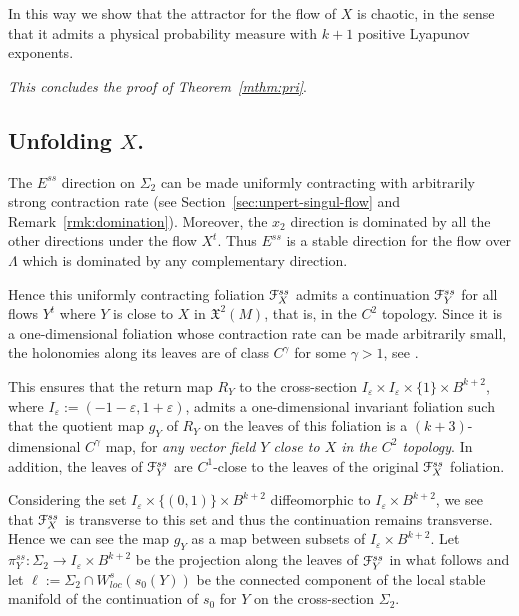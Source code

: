 \documentclass[reqno,12pt,a4paper]{amsart}
\theoremstyle{plain}
\theoremstyle{definition}
\begin{document}
In this way we show that the attractor for the flow of
$X$ is chaotic, in the sense that it admits a physical
probability measure with $k+1$ positive Lyapunov exponents.

\emph{This concludes the proof of Theorem~\ref{mthm:pri}}.

\subsection{Unfolding $X$.}
\label{sec:unfold-x}

The $E^{ss}$ direction on $\Sigma_2$ can be made uniformly
contracting with arbitrarily strong contraction rate (see
Section~\ref{sec:unpert-singul-flow} and
Remark~\ref{rmk:domination}). Moreover, the $x_2$
direction is dominated by all the other
directions under the flow $X^t$. Thus $E^{ss}$ 
is a stable direction for the flow over $\Lambda$ which is
dominated by any complementary direction.

Hence this uniformly contracting foliation ${\EuScript{F}}^{ss}_X$ admits
a continuation ${\EuScript{F}}^{ss}_Y$ for all flows $Y^t$ where $Y$ is
close to $X$ in ${{\mathfrak X}}^2(M)$, that is, in the $C^2$
topology. Since it is a one-dimensional foliation whose
contraction rate can be made arbitrarily small, the
holonomies along its leaves are of class $C^{\gamma}$ for
some $\gamma>1$, see \cite[Theorem 6.2]{HP70}.

This ensures that the return map $R_Y$ to the cross-section
$I_{\varepsilon}\times I_{\varepsilon}\times\{1\}\times B^{k+2}$,
where $I_{\varepsilon}:=(-1-{\varepsilon},1+{\varepsilon})$, admits a
one-dimensional invariant foliation such that the quotient
map $g_Y$ of $R_Y$ on the leaves of this foliation is a
$(k+3)$-dimensional $C^{\gamma}$ map, for \emph{any vector
  field $Y$ close to $X$ in the $C^2$ topology}. In
addition, the leaves of ${\EuScript{F}}^{ss}_Y$ are $C^1$-close to
the leaves of the original ${\EuScript{F}}^{ss}_X$ foliation.

Considering the set $I_{\varepsilon}\times\{(0,1)\}\times
B^{k+2}$ diffeomorphic to $I_{\varepsilon}\times B^{k+2}$, we see
that ${\EuScript{F}}^{ss}_X$ is transverse to this set and thus the
continuation remains transverse. Hence we can see the map
$g_Y$ as a map between subsets of $I_{\varepsilon}\times
B^{k+2}$. Let $\pi^{ss}_Y:\Sigma_2\to I_{\varepsilon}\times
B^{k+2}$ be the projection along the leaves of ${\EuScript{F}}^{ss}_Y$
in what follows and let $\ell:=\Sigma_2\cap
W^s_{loc}(s_0(Y))$ be the connected component of the local
stable manifold of the continuation of $s_0$ for $Y$ on the
cross-section $\Sigma_2$.
\end{document}

